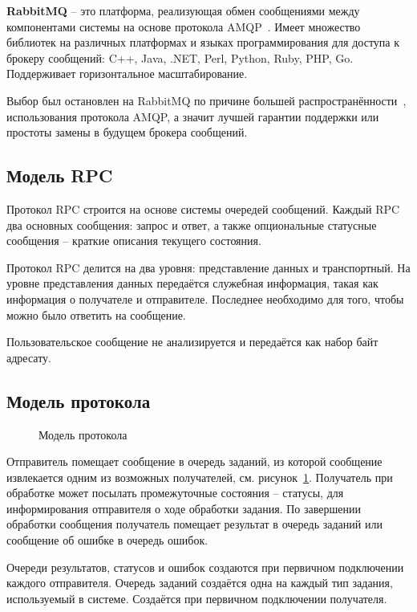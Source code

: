 \textbf{RabbitMQ} -- это платформа, реализующая обмен сообщениями между
компонентами системы на основе протокола AMQP~\cite{amqp}.
Имеет множество библиотек на различных платформах и языках программирования
для доступа к брокеру сообщений: C++, Java, .NET, Perl, Python, Ruby, PHP, Go.
Поддерживает горизонтальное масштабирование.

Выбор был остановлен на RabbitMQ по причине большей
распространённости~\cite{mqcomparison}, использования протокола AMQP,
а значит лучшей гарантии поддержки или простоты замены в будущем брокера
сообщений.

\subsection{Модель RPC} %
Протокол RPC строится на основе системы очередей сообщений.
Каждый RPC два основных сообщения: запрос и ответ, а также опциональные
статусные сообщения -- краткие описания текущего состояния.

Протокол RPC делится на два уровня: представление данных и транспортный.
На уровне представления данных передаётся служебная информация, такая как
информация о получателе и отправителе. Последнее необходимо для того,
чтобы можно было ответить на сообщение.

Пользовательское сообщение не анализируется и передаётся как набор байт адресату.

\subsection{Модель протокола}
\begin{figure}[H]
    \centering
    
    \caption{Модель протокола}
    \label{fig:brokerproto}
\end{figure}

Отправитель помещает сообщение в очередь заданий, из которой сообщение
извлекается одним из возможных получателей, см. рисунок~\ref{fig:brokerproto}.
Получатель при обработке может посылать промежуточные состояния -- статусы,
для информирования отправителя о ходе обработки задания. По завершении
обработки сообщения получатель помещает результат в очередь заданий
или сообщение об ошибке в очередь ошибок.

Очереди результатов, статусов и ошибок создаются при первичном подключении
каждого отправителя. Очередь заданий создаётся одна на каждый тип задания,
используемый в системе. Создаётся при первичном подключении получателя.

